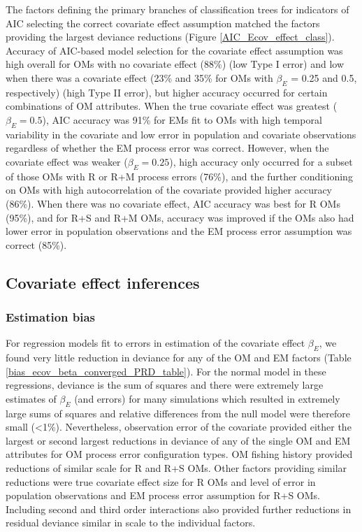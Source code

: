 \documentclass[
  12pt,
]{article}
\begin{document}
The factors defining the primary branches of classification trees for indicators of AIC selecting the correct covariate effect assumption matched the factors providing the largest deviance reductions (Figure \ref{AIC_Ecov_effect_class}). Accuracy of AIC-based model selection for the covariate effect assumption was high overall for OMs with no covariate effect (88\%) (low Type I error) and low when there was a covariate effect (23\% and 35\% for OMs with \(\beta_E\) = 0.25 and 0.5, respectively) (high Type II error), but higher accuracy occurred for certain combinations of OM attributes. When the true covariate effect was greatest (\(\beta_E = 0.5\)), AIC accuracy was 91\% for EMs fit to OMs with high temporal variability in the covariate and low error in population and covariate observations regardless of whether the EM process error was correct. However, when the covariate effect was weaker (\(\beta_E = 0.25\)), high accuracy only occurred for a subset of those OMs with R or R+M process errors (76\%), and the further conditioning on OMs with high autocorrelation of the covariate provided higher accuracy (86\%). When there was no covariate effect, AIC accuracy was best for R OMs (95\%), and for R+S and R+M OMs, accuracy was improved if the OMs also had lower error in population observations and the EM process error assumption was correct (85\%).

\subsection*{Covariate effect inferences}\label{covariate-effect-inferences}

\subsubsection*{Estimation bias}\label{estimation-bias}

For regression models fit to errors in estimation of the covariate effect \(\beta_E\), we found very little reduction in deviance for any of the OM and EM factors (Table \ref{bias_ecov_beta_converged_PRD_table}). For the normal model in these regressions, deviance is the sum of squares and there were extremely large estimates of \(\beta_E\) (and errors) for many simulations which resulted in extremely large sums of squares and relative differences from the null model were therefore small (\textless1\%). Nevertheless, observation error of the covariate provided either the largest or second largest reductions in deviance of any of the single OM and EM attributes for OM process error configuration types. OM fishing history provided reductions of similar scale for R and R+S OMs. Other factors providing similar reductions were true covariate effect size for R OMs and level of error in population observations and EM process error assumption for R+S OMs. Including second and third order interactions also provided further reductions in residual deviance similar in scale to the individual factors.
\end{document}
